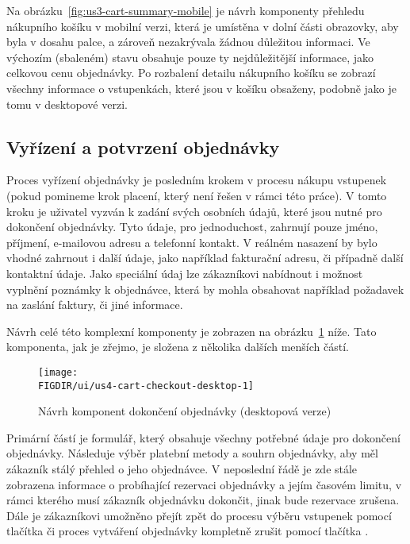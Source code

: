 Na obrázku~\ref{fig:us3-cart-summary-mobile} je návrh komponenty přehledu nákupního košíku v mobilní verzi, která je umístěna v dolní části obrazovky, aby byla v dosahu palce, a zároveň nezakrývala žádnou důležitou informaci.
Ve výchozím (sbaleném) stavu obsahuje pouze ty nejdůležitější informace, jako celkovou cenu objednávky.
Po rozbalení detailu nákupního košíku se zobrazí všechny informace o vstupenkách, které jsou v košíku obsaženy, podobně jako je tomu v desktopové verzi.

\subsection{Vyřízení a potvrzení objednávky}
\label{subsec:narvh-ui-transformace-uzivatelskych-pribehu-vyrideni-a-potvrzeni-objednavky}
\userstorycheckout

Proces vyřízení objednávky je posledním krokem v procesu nákupu vstupenek (pokud pomineme krok placení, který není řešen v rámci této práce).
V tomto kroku je uživatel vyzván k zadání svých osobních údajů, které jsou nutné pro dokončení objednávky.
Tyto údaje, pro jednoduchost, zahrnují pouze jméno, příjmení, e-mailovou adresu a telefonní kontakt.
V reálném nasazení by bylo vhodné zahrnout i další údaje, jako například fakturační adresu, či případně další kontaktní údaje.
Jako speciální údaj lze zákazníkovi nabídnout i možnost vyplnění poznámky k objednávce, která by mohla obsahovat například požadavek na zaslání faktury, či jiné informace.

Návrh celé této komplexní komponenty je zobrazen na obrázku~\ref{fig:us4-cart-checkout-desktop} níže.
Tato komponenta, jak je zřejmo, je složena z několika dalších menších částí.

\begin{figure}[H]
    \centering
    \texttt{[image: \\FIGDIR/ui/us4-cart-checkout-desktop-1]}
    \caption{Návrh komponent dokončení objednávky (desktopová verze)}
    \label{fig:us4-cart-checkout-desktop}
\end{figure}

Primární částí je formulář, který obsahuje všechny potřebné údaje pro dokončení objednávky.
Následuje výběr platební metody a souhrn objednávky, aby měl zákazník stálý přehled o jeho objednávce.
V neposlední řádě je zde stále zobrazena informace o probíhající rezervaci objednávky a jejím časovém limitu, v rámci kterého musí zákazník objednávku dokončit, jinak bude rezervace zrušena.
Dále je zákazníkovi umožněno přejít zpět do procesu výběru vstupenek pomocí tlačítka  či proces vytváření objednávky kompletně zrušit pomocí tlačítka .

